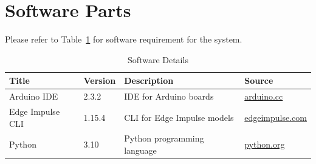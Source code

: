 \section{Software Parts}
Please refer to Table~\ref{tab:software-bill} for software requirement for the system.

\begin{table}[h!]
	\centering
	\begin{tabular}{|l|l|l|l|}
		\hline
		\textbf{Title} & \textbf{Version} & \textbf{Description} & \textbf{Source} \\ \hline
		Arduino IDE & 2.3.2 & IDE for Arduino boards & \href{https://www.arduino.cc}{arduino.cc} \\ \hline
		Edge Impulse CLI & 1.15.4 & CLI for Edge Impulse models & \href{https://www.edgeimpulse.com}{edgeimpulse.com} \\ \hline
		Python & 3.10 & Python programming language & \href{https://www.python.org}{python.org} \\ \hline
	\end{tabular}
	\caption{Software Details}
	\label{tab:software-bill}
\end{table}